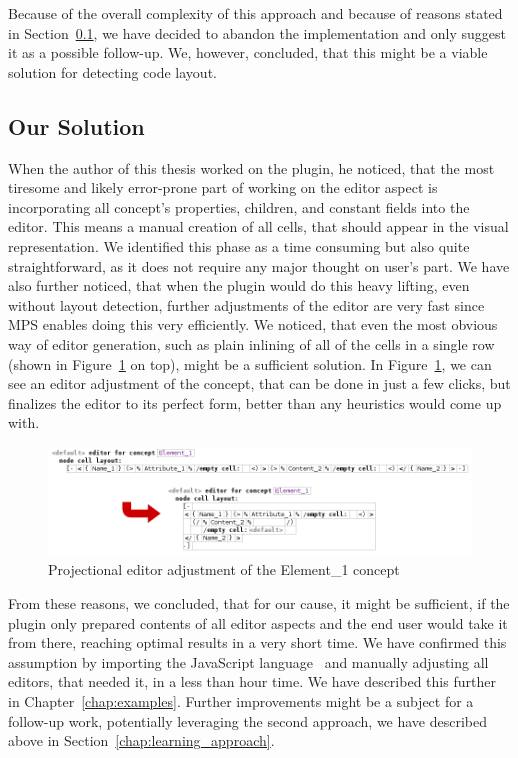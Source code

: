 Because of the overall complexity of this approach and because of reasons stated in Section~\ref{chap:editor_solution}, we have decided to abandon the implementation and only suggest it as a possible follow-up.
We, however, concluded, that this might be a viable solution for detecting code layout.

\subsection{Our Solution}
\label{chap:editor_solution}

When the author of this thesis worked on the plugin, he noticed, that the most tiresome and likely error-prone part of working on the editor aspect is incorporating all concept's properties, children, and constant fields into the editor.
This means a manual creation of all cells, that should appear in the visual representation.
We identified this phase as a time consuming but also quite straightforward, as it does not require any major thought on user's part.
We have also further noticed, that when the plugin would do this heavy lifting, even without layout detection, further adjustments of the editor are very fast since MPS enables doing this very efficiently.
We noticed, that even the most obvious way of editor generation, such as plain inlining of all of the cells in a single row (shown in Figure~\ref{fig:editor_adjustment} on top), might be a sufficient solution.
In Figure~\ref{fig:editor_adjustment}, we can see an editor adjustment of the  concept, that can be done in just a few clicks, but finalizes the editor to its perfect form, better than any heuristics would come up with.
\\

\begin{figure}[h]
	\centering
	\includegraphics[width=\textwidth]{./img/editor_adjustment.png}
	\caption{Projectional editor adjustment of the Element{\_}1 concept}
	\label{fig:editor_adjustment}
\end{figure}

From these reasons, we concluded, that for our cause, it might be sufficient, if the plugin only prepared contents of all editor aspects and the end user would take it from there, reaching optimal results in a very short time.
We have confirmed this assumption by importing the JavaScript language~\cite{javascript} and manually adjusting all editors, that needed it, in a less than hour time.
We have described this further in Chapter~\ref{chap:examples}.
Further improvements might be a subject for a follow-up work, potentially leveraging the second approach, we have described above in Section~\ref{chap:learning_approach}.

